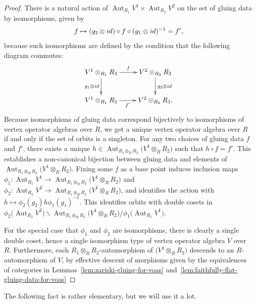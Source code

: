 \documentclass[11pt]{article}
\DeclareMathOperator{\Aut}{Aut}
\theoremstyle{definition}
\begin{document}
\begin{proof}There is a natural action of $\Aut_{R_1} V^1 \times \Aut_{R_2} V^2$ on the set of gluing data by isomorphisms, given by
\begin{gather*} f \mapsto (g_2 \otimes {\rm id}) \circ f \circ (g_1 \otimes {\rm id})^{-1} = f', \end{gather*}
because such isomorphisms are defined by the condition that the following diagram commutes:
\begin{gather*} \xymatrix{ V^1 \otimes_{R_1} R_3 \ar[r]^-{f} \ar[d]_{g_1 \otimes {\rm id}} & V^2 \otimes_{R_2} R_3 \ar[d]^{g_2 \otimes {\rm id}} \\ V^1 \otimes_{R_1} R_3 \ar[r]_-{f'} & V^2 \otimes_{R_2} R_3 . } \end{gather*}
Because isomorphisms of gluing data correspond bijectively to isomorphisms of vertex operator algebras over $R$, we get a unique vertex operator algebra over $R$ if and only if the set of orbits is a singleton. For any two choices of gluing data $f$ and $f'$, there exists a unique $h \in \Aut_{R_1 \otimes_{R} R_2} \big(V^1 \otimes_{R} R_2\big)$ such that $h \circ f = f'$. This establishes a non-canonical bijection between gluing data and elements of $\Aut_{R_1 \otimes_{R} R_2} \big(V^1 \otimes_{R} R_2\big)$. Fixing some $f$ as a base point induces inclusion maps $\phi_1\colon \Aut_{R_1} V^1 \to \Aut_{R_1 \otimes_{R} R_2} \big(V^1 \otimes_{R} R_2\big)$ and $\phi_2\colon \Aut_{R_2} V^2 \to \Aut_{R_1 \otimes_{R} R_2} \big(V^1 \otimes_{R} R_2\big)$, and identifies the action with $h \mapsto \phi_2(g_2) h \phi_1(g_1)^{-1}$. This identifies orbits with double cosets in $\phi_2\big(\Aut_{R_2} V^2\big) \backslash \Aut_{R_1 \otimes_{R} R_2}\big(V^1 \otimes_{R} R_2\big) / \phi_1\big(\Aut_{R_1} V^1\big)$.

For the special case that $\phi_1$ and $\phi_2$ are isomorphisms, there is clearly a single double coset, hence a single isomorphism type of vertex operator algebra $V$ over $R$. Furthermore, each $R_1 \otimes_{R} R_2$-automorphism of $\big(V^1 \otimes_{R} R_2\big)$ descends to an $R$-automorphism of $V$, by effective descent of morphisms given by the equivalences of categories in Lemmas~\ref{lem:zariski-gluing-for-voas} and~\ref{lem:faithfully-flat-gluing-data-for-voas}
\end{proof}

The following fact is rather elementary, but we will use it a lot.
\end{document}
